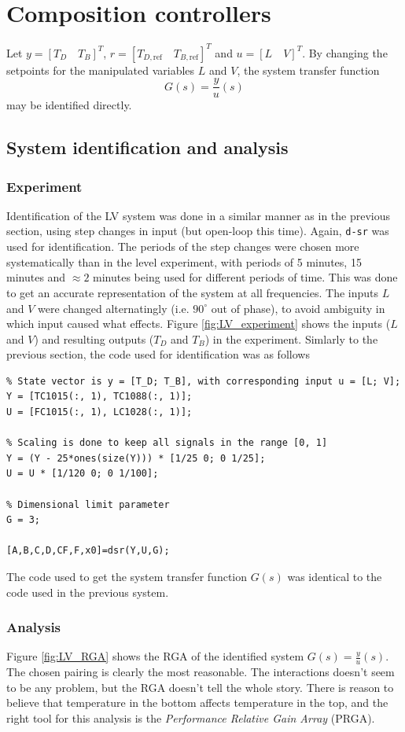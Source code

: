 \documentclass[12pt]{article}
\begin{document}
\newpage
\section{Composition controllers}
Let $y = [T_D \quad T_B]^T$, $r = [T_{D, \textrm{ref}} \quad T_{B, \textrm{ref}}]^T$ and $u = [L \quad V]^T$. By changing the setpoints for the manipulated variables $L$ and $V$, the system transfer function
\begin{equation}
G(s) = \frac{y}{u}(s)
\end{equation}
may be identified directly.
\subsection{System identification and analysis}
\subsubsection{Experiment}
Identification of the LV system was done in a similar manner as in the previous section, using step changes in input (but open-loop this time). Again, \texttt{d-sr} was used for identification. The periods of the step changes were chosen more systematically than in the level experiment, with periods of 5 minutes, 15 minutes and $\approx2$ minutes being used for different periods of time. This was done to get an accurate representation of the system at all frequencies. The inputs $L$ and $V$ were changed alternatingly (i.e. $90^\circ$ out of phase), to avoid ambiguity in which input caused what effects. Figure \ref{fig:LV_experiment} shows the inputs ($L$ and $V$) and resulting outputs ($T_D$ and $T_B$) in the experiment. Simlarly to the previous section, the code used for identification was as follows

\begin{verbatim}
% State vector is y = [T_D; T_B], with corresponding input u = [L; V];
Y = [TC1015(:, 1), TC1088(:, 1)];
U = [FC1015(:, 1), LC1028(:, 1)];

% Scaling is done to keep all signals in the range [0, 1]
Y = (Y - 25*ones(size(Y))) * [1/25 0; 0 1/25];
U = U * [1/120 0; 0 1/100];

% Dimensional limit parameter
G = 3;

[A,B,C,D,CF,F,x0]=dsr(Y,U,G);
\end{verbatim}
The code used to get the system transfer function $G(s)$ was identical to the code used in the previous system.

\subsubsection{Analysis}
Figure \ref{fig:LV_RGA} shows the RGA of the identified system $G(s) = \frac{y}{u}(s)$. The chosen pairing is clearly the most reasonable. The interactions doesn't seem to be any problem, but the RGA doesn't tell the whole story. There is reason to believe that temperature in the bottom affects temperature in the top, and the right tool for this analysis is the \textit{Performance Relative Gain Array} (PRGA).
\end{document}
